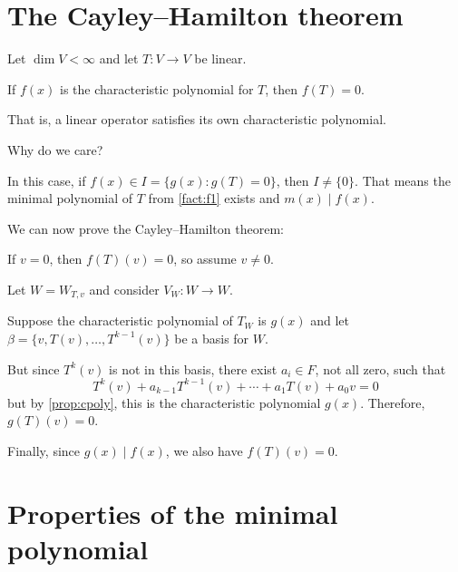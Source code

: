 \documentclass[notes,tikz]{agony}
\begin{document}
\section{The Cayley--Hamilton theorem}
\begin{theorem}
  Let $\dim V < \infty$ and let $T : V \to V$ be linear.

  If $f(x)$ is the characteristic polynomial for $T$, then $f(T) = 0$.

  That is, a linear operator satisfies its own characteristic polynomial.
\end{theorem}

Why do we care?

\begin{remark}
  In this case, if $f(x) \in I = \{g(x) : g(T) = 0\}$,
  then $I \neq \{0\}$.
  That means the minimal polynomial of $T$ from \cref{fact:f1} exists
  and $m(x) \mid f(x)$.
\end{remark}

We can now prove the Cayley--Hamilton theorem:

\begin{prf}
  If $v = 0$, then $f(T)(v) = 0$,
  so assume $v \neq 0$.

  Let $W = W_{T,v}$ and consider $V_W : W \to W$.

  Suppose the characteristic polynomial of $T_W$
  is $g(x)$ and let $\beta = \{v,T(v),\dotsc,T^{k-1}(v)\}$ be a basis for $W$.

  But since $T^k(v)$ is not in this basis,
  there exist $a_i \in F$, not all zero, such that
  \[ T^k(v) + a_{k-1}T^{k-1}(v) + \dotsb + a_1T(v) + a_0v = 0 \]
  but by \cref{prop:cpoly}, this is the characteristic polynomial $g(x)$.
  Therefore, $g(T)(v) = 0$.

  Finally, since $g(x) \mid f(x)$, we also have $f(T)(v) = 0$.
\end{prf}

\section{Properties of the minimal polynomial}
\end{document}
